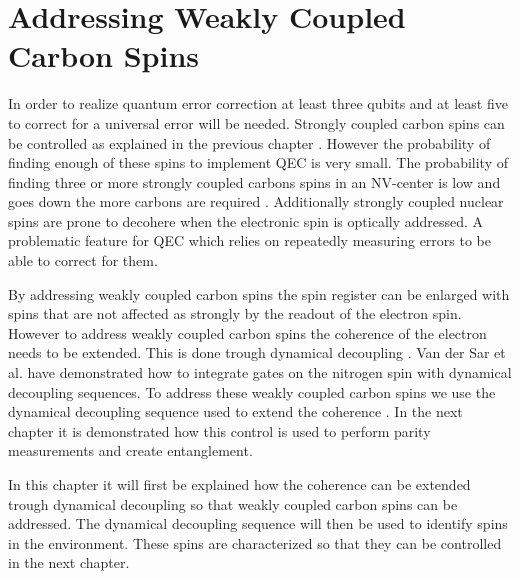 
\chapter{Addressing Weakly Coupled Carbon Spins}
\label{chap:addressing_weakly_coupled_carbons}

In order to realize quantum error correction at least three qubits and at least five to correct for a universal error will be needed.
Strongly coupled carbon spins can be controlled as explained in the previous chapter \citep{Robledo2011HighFidelity,Waldherr2014Quantum}.
However the probability of finding enough of these spins to implement QEC is very small.
The probability of finding three or more strongly coupled carbons spins in an NV-center is low and goes down the more carbons are required \citep{Waldherr2014Quantum,Taminiau2014Universal}.
Additionally strongly coupled nuclear spins are prone to decohere when the electronic spin is optically addressed\citep{Pfaff2012Demonstration}.
A problematic feature for QEC which relies on repeatedly measuring errors to be able to correct for them.

By addressing weakly coupled carbon spins the spin register can be enlarged with spins that are not affected as strongly by the readout of the electron spin.
However to address weakly coupled carbon spins the coherence of the electron needs to be extended.
This is done trough dynamical decoupling \citep{Lange2010Universal}.
Van der Sar et al. \citep{Sar2012DecoherenceProtected} have demonstrated how to integrate gates on the nitrogen spin with dynamical decoupling sequences.
To address these weakly coupled carbon spins we use the dynamical decoupling sequence used to extend the coherence \citep{Taminiau2012Detection}.
In the next chapter it is demonstrated how this control is used to perform parity measurements and create entanglement.

In this chapter it will first be explained how the coherence can be extended trough dynamical decoupling so that weakly coupled carbon spins can be addressed.
The dynamical decoupling sequence will then be used to identify spins in the environment.
These spins are characterized so that they can be controlled in the next chapter.





